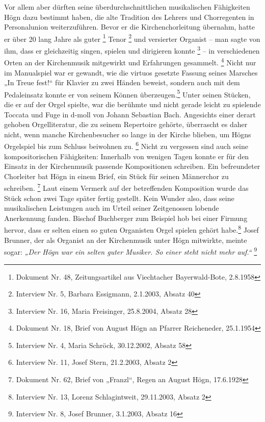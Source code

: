 \documentclass[a4paper]{article}
\newcommand\textstyleZitate[1]{\textit{#1}}
\begin{document}
Vor allem aber dürften seine überdurchschnittlichen musikalischen
Fähigkeiten Högn dazu bestimmt haben, die alte Tradition des Lehrers
und Chorregenten in Personalunion weiterzuführen. Bevor er die
Kirchenchorleitung übernahm, hatte er über 20 lang Jahre als
guter \footnote{Dokument Nr. 48, Zeitungsartikel aus Viechtacher
Bayerwald-Bote, 2.8.1958} Tenor \footnote{Interview Nr. 5, Barbara
Essigmann, 2.1.2003, Absatz 40} und versierter Organist – man sagte von
ihm, dass er gleichzeitig singen, spielen und dirigieren
konnte \footnote{Interview Nr. 16, Maria Freisinger, 25.8.2004, Absatz
28} – in verschiedenen Orten an der Kirchenmusik mitgewirkt und
Erfahrungen gesammelt. \footnote{Dokument Nr. 18, Brief von August Högn
an Pfarrer Reicheneder, 25.1.1954} Nicht nur im Manualspiel war er
gewandt, wie die virtuos gesetzte Fassung seines Marsches „In Treue
fest!“ für Klavier zu zwei Händen beweist, sondern auch mit dem
Pedaleinsatz konnte er von seinem Können überzeugen.\footnote{
Interview Nr. 4, Maria Schröck, 30.12.2002, Absatz 58} Unter seinen
Stücken, die er auf der Orgel spielte, war die berühmte und nicht
gerade leicht zu spielende Toccata und Fuge in d-moll von Johann
Sebastian Bach. Angesichts einer derart gehoben Orgelliteratur, die zu
seinem Repertoire gehörte, überrascht es daher nicht, wenn manche
Kirchenbesucher so lange in der Kirche blieben, um Högns Orgelspiel bis
zum Schluss beiwohnen zu. \footnote{Interview Nr. 11, Josef Stern,
21.2.2003, Absatz 2} Nicht zu vergessen sind auch seine
kompositorischen Fähigkeiten: Innerhalb von wenigen Tagen konnte er für
den Einsatz in der Kirchenmusik passende Kompositionen schreiben. Ein
befreundeter Chorleiter bat Högn in einem Brief, ein Stück für seinen
Männerchor zu schreiben. \footnote{Dokument Nr. 62, Brief von „Franzl“,
Regen an August Högn, 17.6.1928} Laut einem Vermerk auf der
betreffenden Komposition wurde das Stück schon zwei Tage später fertig
gestellt. Kein Wunder also, dass seine musikalischen Leistungen auch im
Urteil seiner Zeitgenossen lobende Anerkennung fanden. Bischof
Buchberger zum Beispiel hob bei einer Firmung hervor, dass er selten
einen so guten Organisten Orgel spielen gehört habe.\footnote{
Interview Nr. 13, Lorenz Schlagintweit, 29.11.2003, Absatz 2} Josef
Brunner, der als Organist an der Kirchenmusik unter Högn mitwirkte,
meinte sogar: \textstyleZitate{„Der Högn war ein selten guter Musiker.
So einer steht nicht mehr auf.“ } \footnote{Interview Nr. 8, Josef
Brunner, 3.1.2003, Absatz 16}
\end{document}
